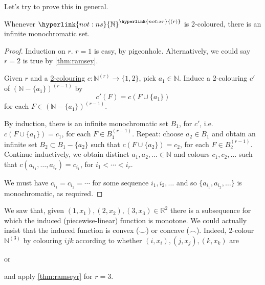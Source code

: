 \documentclass{article}
\begin{document}
Let's try to prove this in general.
\begin{nthm}\label{thm:ramseyr}
  Whenever $\hyperlink{not:ns}{\mathbb{N}}^{\hyperlink{not:xr}{(r)}}$ is 2-coloured, there is an infinite monochromatic set.
\end{nthm}
\begin{proof}
  Induction on $r$. $r=1$ is easy, by pigeonhole. Alternatively, we could say $r=2$ is true by \cref{thm:ramsey}.

  Given $r$ and a \hyperlink{def:2colouring}{2-colouring} $c: \mathbb{N}^{(r)} \to \{1,2\}$, pick $a_1 \in \mathbb{N}$. Induce a 2-colouring $c'$ of $(\mathbb{N}-\{a_1\})^{(r-1)}$ by
  \begin{equation*}
    c'(F) = c(F \cup \{a_1\})
  \end{equation*}
  for each $F \in (\mathbb{N} - \{a_1\})^{(r-1)}$.

  By induction, there is an infinite monochromatic set $B_1$, for $c'$, i.e.\ $c(F \cup \{a_1\}) = c_1$, for each $F \in B_1^{(r-1)}$.
  Repeat: choose $a_2 \in B_1$ and obtain an infinite set $B_2 \subset B_1 - \{a_2\}$ such that $c(F \cup \{a_2\}) = c_2$, for each $F \in B_2^{(r-1)}$.
  Continue inductively, we obtain distinct $a_1, a_2, \dotsc \in \mathbb{N}$ and colours $c_1, c_2, \dotsc$ such that $c(a_{i_1}, \dotsc, a_{i_r}) = c_{i_1}$, for $i_1 < \dotsb < i_r$.

  We must have $c_{i_1} = c_{i_2} = \dotsb$ for some sequence $i_1, i_2, \dotsc$ and so $\{a_{i_1}, a_{i_2}, \dotsc\}$ is monochromatic, as required.
\end{proof}

We saw that, given $(1, x_1), (2, x_2), (3, x_3) \in \mathbb{R}^2$ there is a subsequence for which the induced (piecewise-linear) function is monotone.
We could actually insist that the induced function is convex ($\smile$) or concave ($\frown$).
Indeed, 2-colour $\mathbb{N}^{(3)}$ by colouring $ijk$ according to whether $(i, x_i), (j, x_j), (k, x_k)$ are %
or
and apply \cref{thm:ramseyr} for $r=3$.
\end{document}

